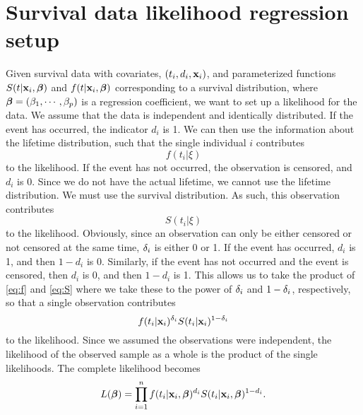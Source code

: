 \section{Survival data likelihood regression setup}
Given survival data with covariates, $(t_i,d_i,\mathbf{x}_i)$, and parameterized functions $S(t|\mathbf{x}_i,\boldsymbol{\beta})$ and $f(t|\mathbf{x}_i,\boldsymbol{\beta})$ corresponding to a survival distribution, where $\boldsymbol{\beta}=(\beta_1,\cdots,\beta_p)$ is a regression coefficient, we want to set up a likelihood for the data. We assume that the data is independent and identically distributed. If the event has occurred, the indicator $d_i$ is 1. We can then use the information about the lifetime distribution, such that the single individual $i$ contributes
\begin{equation}\label{eq:f}
    f(t_i|\xi)
\end{equation}
to the likelihood. If the event has not occurred, the observation is censored, and $d_i$ is 0. Since we do not have the actual lifetime, we cannot use the lifetime distribution. We must use the survival distribution. As such, this observation contributes
\begin{equation}\label{eq:S}
    S(t_i|\xi)
\end{equation}
to the likelihood. Obviously, since an observation can only be either censored or not censored at the same time, $\delta_{i}$ is either 0 or 1. If the event has occurred, $d_i$ is 1, and then $1-d_i$ is 0. Similarly, if the event has not occurred and the event is censored, then $d_i$
 is 0, and then $1-d_i$ is 1. This allows us to take the product of \eqref{eq:f} and \eqref{eq:S} where we take these to the power of $\delta_{i}$ and $1-\delta_{i}$, respectively, so that a single observation contributes
\begin{equation*}
    f(t_{i}|\mathbf{x}_i)^{\delta_{i}}S(t_{i}|\mathbf{x}_i)^{1-\delta_{i}}
\end{equation*}
to the likelihood. Since we assumed the observations were independent, the likelihood of the observed sample as a whole is the product of the single likelihoods. The complete likelihood becomes
\begin{equation}\label{eq:surv-lik}
    L(\boldsymbol{\beta})=\prod_{i=1}^n f(t_i|\mathbf{x}_i,\boldsymbol{\beta})^{d_i} S(t_i|\mathbf{x}_i,\boldsymbol{\beta})^{1-d_i}.
\end{equation}


